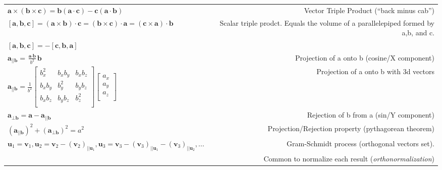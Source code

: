 \documentclass{article}
\begin{document}
{\begin{tabulary}{8in}{LR}
$ \textbf{a} \times (\textbf{b} \times \textbf{c}) = 
\textbf{b}(\textbf{a} \cdot \textbf{c}) - \textbf{c}(\textbf{a} \cdot \textbf{b})$ 
& Vector Triple Product (``back minus cab'') \\

$ [ \textbf{a}, \textbf{b}, \textbf{c} ] 
= (\textbf{a} \times \textbf{b}) \cdot \textbf{c} = (\textbf{b} \times 
\textbf{c}) \cdot \textbf{a} 
= (\textbf{c} \times \textbf{a}) \cdot \textbf{b} $ & 
 Scalar triple prodct. Equals the volume of a parallelepiped formed by a,b, and c. \\
$ [ \textbf{a}, \textbf{b}, \textbf{c} ] = -[ \textbf{c}, \textbf{b}, \textbf{a} ]$ & \\

$ \textbf{a}_{||\textbf{b}} = \frac{\textbf{a} \cdot \textbf{b}}{b^2} \textbf{b} $
& Projection of a onto b (cosine/X component) \\

$ \textbf{a}_{||\textbf{b}} = \frac{1}{b^2} \begin{bmatrix}
  b_x^2 & b_x b_y & b_x b_z \\
  b_x b_y & b_y^2 & b_y b_z \\
  b_x b_z & b_y b_z & b_z^2 \\
\end{bmatrix} 
\begin{bmatrix}
a_x \\
a_y \\
a_z \\
\end{bmatrix}
$ & Projection of a onto b with 3d vectors \\

$ \textbf{a}_{\perp \textbf{b}} = \textbf{a} - \textbf{a}_{||\textbf{b}} $
& Rejection of b from a (sin/Y component) \\

$ (\textbf{a}_{||\textbf{b}})^2 + (\textbf{a}_{\perp \textbf{b}})^2 = a^2 $
& Projection/Rejection property (pythagorean theorem) \\

$ \textbf{u}_1 = \textbf{v}_1, 
\textbf{u}_2 = \textbf{v}_2 - (\textbf{v}_2)_{||\textbf{u}_1}, 
\textbf{u}_3 = \textbf{v}_3 - (\textbf{v}_3)_{||\textbf{u}_1} - (\textbf{v}_3)_{||\textbf{u}_2}, ... $
& Gram-Schmidt process (orthogonal vectors set). \\

& Common to normalize each result
(\textit{orthonormalization}) \\


\end{tabulary}}
\end{document}

